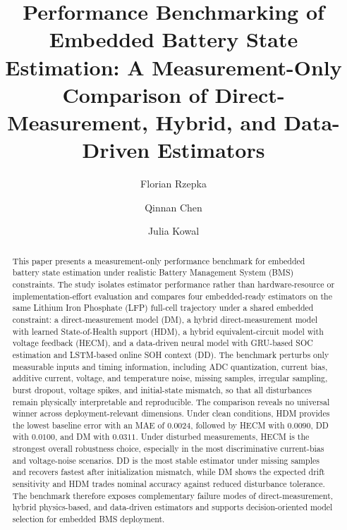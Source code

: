 \documentclass[review,nopreprintline]{elsarticle}
\begin{document}
\begin{frontmatter}

\title{Performance Benchmarking of Embedded Battery State Estimation: A Measurement-Only Comparison of Direct-Measurement, Hybrid, and Data-Driven Estimators}

\author[1]{Florian Rzepka}

\author[1]{Qinnan Chen}

\author[1]{Julia Kowal}



\begin{abstract}
This paper presents a measurement-only performance benchmark for embedded battery state estimation under realistic Battery Management System (BMS) constraints. The study isolates estimator performance rather than hardware-resource or implementation-effort evaluation and compares four embedded-ready estimators on the same Lithium Iron Phosphate (LFP) full-cell trajectory under a shared embedded constraint: a direct-measurement model (DM), a hybrid direct-measurement model with learned State-of-Health support (HDM), a hybrid equivalent-circuit model with voltage feedback (HECM), and a data-driven neural model with GRU-based SOC estimation and LSTM-based online SOH context (DD). The benchmark perturbs only measurable inputs and timing information, including ADC quantization, current bias, additive current, voltage, and temperature noise, missing samples, irregular sampling, burst dropout, voltage spikes, and initial-state mismatch, so that all disturbances remain physically interpretable and reproducible. The comparison reveals no universal winner across deployment-relevant dimensions. Under clean conditions, HDM provides the lowest baseline error with an MAE of $0.0024$, followed by HECM with $0.0090$, DD with $0.0100$, and DM with $0.0311$. Under disturbed measurements, HECM is the strongest overall robustness choice, especially in the most discriminative current-bias and voltage-noise scenarios. DD is the most stable estimator under missing samples and recovers fastest after initialization mismatch, while DM shows the expected drift sensitivity and HDM trades nominal accuracy against reduced disturbance tolerance. The benchmark therefore exposes complementary failure modes of direct-measurement, hybrid physics-based, and data-driven estimators and supports decision-oriented model selection for embedded BMS deployment.
\end{abstract}


\end{frontmatter}
\end{document}

